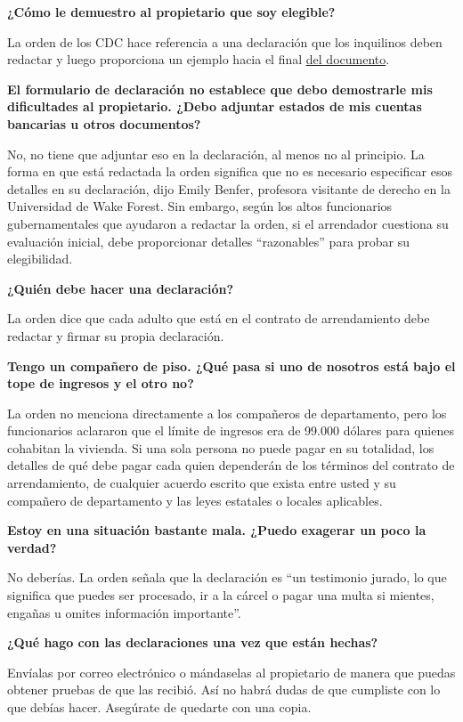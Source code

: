 \textbf{¿Cómo le demuestro al propietario que soy elegible?}

La orden de los CDC hace referencia a una declaración que los inquilinos
deben redactar y luego proporciona un ejemplo hacia el final
\href{https://s3.amazonaws.com/public-inspection.federalregister.gov/2020-19654.pdf}{del
documento}.

\textbf{El formulario de declaración no establece que debo demostrarle
mis dificultades al propietario. ¿Debo adjuntar estados de mis cuentas
bancarias u otros documentos?}

No, no tiene que adjuntar eso en la declaración, al menos no al
principio. La forma en que está redactada la orden significa que no es
necesario especificar esos detalles en su declaración, dijo Emily
Benfer, profesora visitante de derecho en la Universidad de Wake Forest.
Sin embargo, según los altos funcionarios gubernamentales que ayudaron a
redactar la orden, si el arrendador cuestiona su evaluación inicial,
debe proporcionar detalles ``razonables'' para probar su elegibilidad.

\textbf{¿Quién debe hacer una declaración?}

La orden dice que cada adulto que está en el contrato de arrendamiento
debe redactar y firmar su propia declaración.

\textbf{Tengo un compañero de piso. ¿Qué pasa si uno de nosotros está
bajo el tope de ingresos y el otro no?}

La orden no menciona directamente a los compañeros de departamento, pero
los funcionarios aclararon que el límite de ingresos era de 99.000
dólares para quienes cohabitan la vivienda. Si una sola persona no puede
pagar en su totalidad, los detalles de qué debe pagar cada quien
dependerán de los términos del contrato de arrendamiento, de cualquier
acuerdo escrito que exista entre usted y su compañero de departamento y
las leyes estatales o locales aplicables.

\textbf{Estoy en una situación bastante mala. ¿Puedo exagerar un poco la
verdad?}

No deberías. La orden señala que la declaración es ``un testimonio
jurado, lo que significa que puedes ser procesado, ir a la cárcel o
pagar una multa si mientes, engañas u omites información importante''.

\textbf{¿Qué hago con las declaraciones una vez que están hechas?}

Envíalas por correo electrónico o mándaselas al propietario de manera
que puedas obtener pruebas de que las recibió. Así no habrá dudas de que
cumpliste con lo que debías hacer. Asegúrate de quedarte con una copia.

